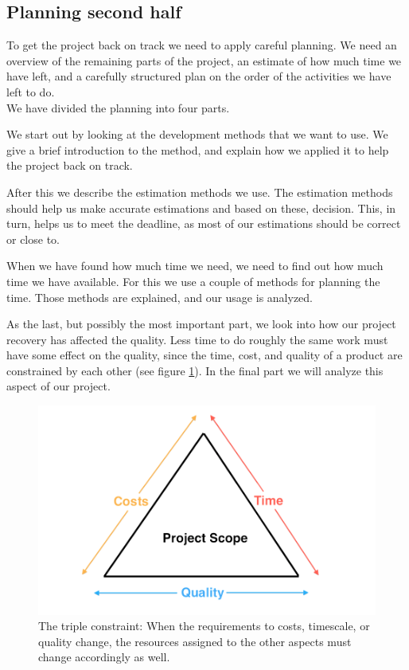 \subsection{Planning second half}
To get the project back on track we need to apply careful planning. We need an overview of the remaining parts of the project, an estimate of how much time we have left, and a carefully structured plan on the order of the activities we have left to do.\\
We have divided the planning into four parts.

We start out by looking at the development methods that we want to use. We give a brief introduction to the method, and explain how we applied it to help the project back on track.

After this we describe the estimation methods we use. The estimation methods should help us make accurate estimations and based on these, decision. This, in turn, helps us to meet the deadline, as most of our estimations should be correct or close to.

When we have found how much time we need, we need to find out how much time we have available. For this we use a couple of methods for planning the time. Those methods are explained, and our usage is analyzed.

As the last, but possibly the most important part, we look into how our project recovery has affected the quality. Less time to do roughly the same work must have some effect on the quality, since the time, cost, and quality of a product are constrained by each other (see figure \ref{fig:timeCostsQuality})\cite[p. 191]{PM}. In the final part we will analyze this aspect of our project.

\begin{figure}[H]
  \includegraphics[width=\textwidth]{illustrations/timeCostsQuality}
  \caption{The triple constraint: When the requirements to costs, timescale, or quality change, the resources assigned to the other aspects must change accordingly as well.}
  \label{fig:timeCostsQuality}
\end{figure}